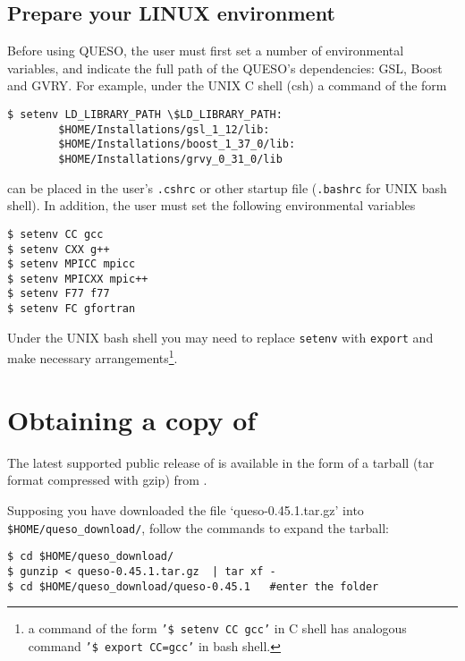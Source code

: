 \subsection{Prepare your LINUX environment}\label{sec:prepare}



Before using QUESO, the user must first set a number of environmental variables, and indicate the full path
of the QUESO's dependencies: GSL, Boost and GVRY. For example, under the UNIX C shell (csh) a command of the form
\begin{lstlisting}
$ setenv LD_LIBRARY_PATH \$LD_LIBRARY_PATH:
		$HOME/Installations/gsl_1_12/lib:
		$HOME/Installations/boost_1_37_0/lib:
		$HOME/Installations/grvy_0_31_0/lib
\end{lstlisting}
can be placed in the user's \verb+.cshrc+ or other startup file (\verb+.bashrc+ for UNIX bash shell). In addition, the user must set the following environmental
variables
\begin{lstlisting}
$ setenv CC gcc
$ setenv CXX g++
$ setenv MPICC mpicc
$ setenv MPICXX mpic++
$ setenv F77 f77
$ setenv FC gfortran 
\end{lstlisting}

Under the UNIX bash shell you may need to replace \texttt{setenv} with \texttt{export} and make necessary arrangements\footnote{a command of the form \texttt{'\$ setenv CC gcc'} in C shell has analogous command \texttt{'\$ export CC=gcc'} in bash shell.}.

\section{Obtaining a copy of \Queso{}}

The latest supported public release of \Queso{} is available in the form of a tarball (tar format compressed with gzip) from \Quesoweb{}.

Supposing you have downloaded the file `queso-0.45.1.tar.gz' into \texttt{\$HOME/queso\_download/}, follow the commands to expand the tarball:
\begin{lstlisting}
$ cd $HOME/queso_download/
$ gunzip < queso-0.45.1.tar.gz  | tar xf -
$ cd $HOME/queso_download/queso-0.45.1   #enter the folder 
\end{lstlisting}

